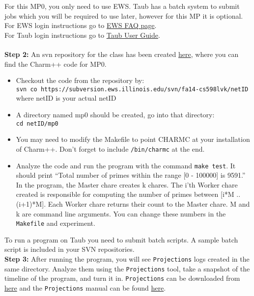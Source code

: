\documentclass{article}
\begin{document}
For this MP0, you only need to use EWS. Taub has a batch
system to submit jobs which you will be required to use later, however for this MP
it is optional.\\
For EWS login instructions go to
\href{http://it.engineering.illinois.edu/ews/lab-information/ews-faq}{EWS FAQ page}.\\
For Taub login instructions go to
\href{https://campuscluster.illinois.edu/user\_info/doc/}{Taub User Guide}.\\
\\
\textbf{Step 2:} An svn repository for the class has been created
\href{https://subversion.ews.illinois.edu/svn/fa14-cs598lvk/}{here},
where you can find the Charm++ code for MP0.\\
\begin{itemize}
\item Checkout the code from the repository by:\\
        \texttt{svn co
        https://subversion.ews.illinois.edu/svn/fa14-cs598lvk/netID}\\
        where netID is your actual netID
\item A directory named mp0 should be created, go into that directory:\\
        \texttt{cd netID/mp0}
\item You may need to modify the Makefile to point CHARMC at your installation of Charm++.
Don't forget to include \texttt{/bin/charmc} at the end.
\item Analyze the code and run the program with the command \texttt{make test}.
It should print ``Total number of primes within the range [0 - 100000] is 9591.''
In the program, the Master chare creates k chares.
The i'th Worker chare created is responsible for computing the number of primes between [i*M .. (i+1)*M].
Each Worker chare returns their count to the Master chare.
M and k are command line arguments.
You can change these numbers in the \texttt{Makefile} and experiment.

\end{itemize}
    To run a program on Taub you need to submit batch scripts.
    A sample batch script is included in your SVN repositories.\\

\textbf{Step 3:}  After running the program, you will see \texttt{Projections}
logs created in the same directory.
Analyze them using the \texttt{Projections} tool,
take a snapshot of the timeline of the program, and turn it in.
\texttt{Projections} can be downloaded from \href{http://charm.cs.illinois.edu/software}{here} and the
\texttt{Projections} manual can be found
\href{http://charm.cs.illinois.edu/manuals/html/projections/manual-1p.html}
{here}.\\
\end{document}
